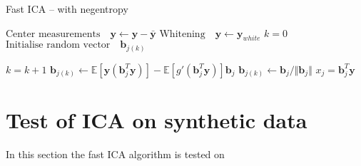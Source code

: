 \begin{algorithm}[H]
\caption{Fast ICA -- with negentropy }
\begin{algorithmic}[1]
			\State $\text{Center measurements} \quad \textbf{y} \gets \textbf{y} - \bar{\textbf{y}}$
			\State $\text{Whitening} \quad \textbf{y}\gets \textbf{y}_{white}$ 
			\EndProcedure  
			\State
			\State$k=0$            
            \State$\text{Initialise random vector} \quad \textbf{b}_{j(k)}$ 
            
               		\State $k = k+1$
                	\State $\textbf{b}_{j(k)} \gets \mathbb{E}[ \textbf{y}(\textbf{b}_{j}^T \textbf{y})] - \mathbb{E}[g'(\textbf{b}_{j}^T \textbf{y})] \textbf{b}_{j}$  
                	\State $\textbf{b}_{j(k)} \gets \textbf{b}_j/\Vert \textbf{b}_j \Vert $ 
          		\EndWhile
          		\State $x_{j} = \textbf{b}_{j}^T\textbf{y}$
          	\EndFor
          	
            \EndProcedure
        \end{algorithmic} 
        \label{alg:fastICA}
\end{algorithm}



\section{Test of ICA on synthetic data}
In this section the fast ICA algorithm is tested on 


